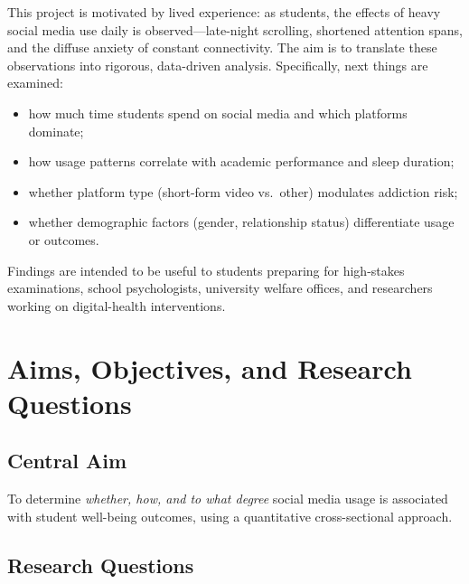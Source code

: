 \documentclass[10pt]{article}
\begin{document}
This project is motivated by lived experience: as students, the
effects of heavy social media use daily is observed---late-night scrolling, shortened
attention spans, and the diffuse anxiety of constant connectivity. The aim is to
translate these observations into rigorous, data-driven analysis. Specifically,
next things are examined:
\begin{itemize}
  \item how much time students spend on social media and which platforms
        dominate;
  \item how usage patterns correlate with academic performance and sleep
        duration;
  \item whether platform type (short-form video vs.\ other) modulates addiction
        risk;
  \item whether demographic factors (gender, relationship status) differentiate
        usage or outcomes.
\end{itemize}

Findings are intended to be useful to students preparing for high-stakes
examinations, school psychologists, university welfare offices, and researchers
working on digital-health interventions.

\section{Aims, Objectives, and Research Questions}

\subsection{Central Aim}

To determine \textit{whether, how, and to what degree} social media usage is
associated with student well-being outcomes, using a quantitative
cross-sectional approach.

\subsection{Research Questions}
\end{document}
